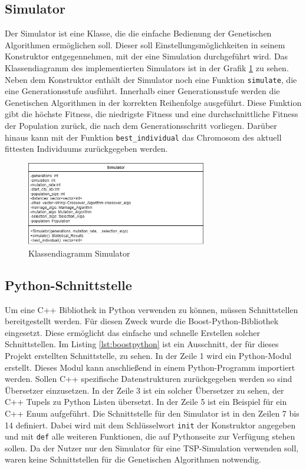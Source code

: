 \subsection{Simulator}
Der Simulator ist eine Klasse, die die einfache Bedienung der Genetischen Algorithmen ermöglichen soll. Dieser soll Einstellungsmöglichkeiten in seinem Konstruktor entgegennehmen, mit der eine Simulation durchgeführt wird. Das Klassendiagramm des implementierten Simulators ist in der Grafik \ref{fig:simulator} zu sehen. Neben dem Konstruktor enthält der Simulator noch eine Funktion \texttt{simulate}, die eine Generationsstufe ausführt. Innerhalb einer Generationsstufe werden die Genetischen Algorithmen in der korrekten Reihenfolge ausgeführt. Diese Funktion gibt die höchste Fitness, die niedrigste Fitness und eine durchschnittliche Fitness der Population zurück, die nach dem Generationsschritt vorliegen. Darüber hinaus kann mit der Funktion \texttt{best\_individual} das Chromosom des aktuell fittesten Individuums zurückgegeben werden.

\begin{figure}[!htb]
\centering
\includegraphics[width=0.7\textwidth]{img/Vortrag/simulator.png}
\caption{Klassendiagramm Simulator}
\label{fig:simulator}
\end{figure}

\subsection{Python-Schnittstelle}
Um eine C++ Bibliothek in Python verwenden zu können, müssen Schnittstellen bereitgestellt werden. Für diesen Zweck wurde die Boost-Python-Bibliothek eingesetzt. Diese ermöglicht das einfache und schnelle Erstellen solcher Schnittstellen. Im Listing \ref{lst:boostpython} ist ein Ausschnitt, der für dieses Projekt erstellten Schnittstelle, zu sehen. In der Zeile 1 wird ein Python-Modul erstellt. Dieses Modul kann anschließend in einem Python-Programm importiert werden. Sollen C++ spezifische Datenstrukturen zurückgegeben werden so sind Übersetzer einzusetzen. In der Zeile 3 ist ein solcher Übersetzer zu sehen, der C++ Tupels zu Python Listen übersetzt. In der Zeile 5 ist ein Beispiel für ein C++ Enum aufgeführt. Die Schnittstelle für den Simulator ist in den Zeilen 7 bis 14 definiert. Dabei wird mit dem Schlüsselwort \texttt{init} der Konstruktor angegeben und mit \texttt{def} alle weiteren Funktionen, die auf Pythonseite zur Verfügung stehen sollen. Da der Nutzer nur den Simulator für eine TSP-Simulation verwenden soll, waren keine Schnittstellen für die Genetischen Algorithmen notwendig.

